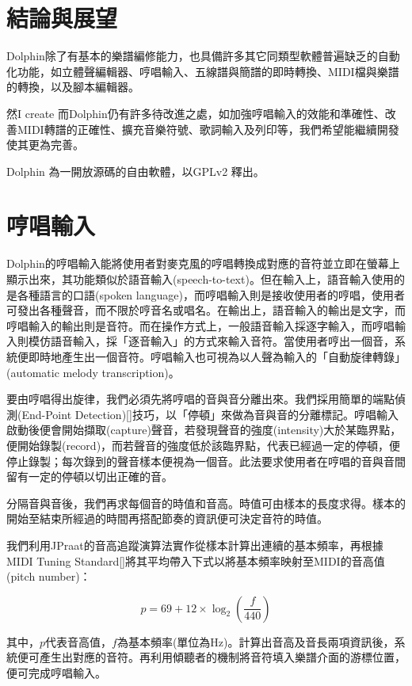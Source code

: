 \documentclass[12pt,a4paper,oneside]{report}
\begin{document}
\chapter{結論與展望}

Dolphin除了有基本的樂譜編修能力，也具備許多其它同類型軟體普遍缺乏的自動化功能，如立體聲編輯器、哼唱輸入、五線譜與簡譜的即時轉換、MIDI檔與樂譜的轉換，以及腳本編輯器。

然I create 而Dolphin仍有許多待改進之處，如加強哼唱輸入的效能和準確性、改善MIDI轉譜的正確性、擴充音樂符號、歌詞輸入及列印等，我們希望能繼續開發使其更為完善。

Dolphin 為一開放源碼的自由軟體，以GPLv2 釋出。


\appendix

\chapter{哼唱輸入}

Dolphin的哼唱輸入能將使用者對麥克風的哼唱轉換成對應的音符並立即在螢幕上顯示出來，其功能類似於語音輸入(speech-to-text)。但在輸入上，語音輸入使用的是各種語言的口語(spoken language)，而哼唱輸入則是接收使用者的哼唱，使用者可發出各種聲音，而不限於哼音名或唱名。在輸出上，語音輸入的輸出是文字，而哼唱輸入的輸出則是音符。而在操作方式上，一般語音輸入採逐字輸入，而哼唱輸入則模仿語音輸入，採「逐音輸入」的方式來輸入音符。當使用者哼出一個音，系統便即時地產生出一個音符。哼唱輸入也可視為以人聲為輸入的「自動旋律轉錄」(automatic melody transcription)。

要由哼唱得出旋律，我們必須先將哼唱的音與音分離出來。我們採用簡單的端點偵測(End-Point Detection)[]技巧，以「停頓」來做為音與音的分離標記。哼唱輸入啟動後便會開始擷取(capture)聲音，若發現聲音的強度(intensity)大於某臨界點，便開始錄製(record)，而若聲音的強度低於該臨界點，代表已經過一定的停頓，便停止錄製；每次錄到的聲音樣本便視為一個音。此法要求使用者在哼唱的音與音間留有一定的停頓以切出正確的音。

分隔音與音後，我們再求每個音的時值和音高。時值可由樣本的長度求得。樣本的開始至結束所經過的時間再搭配節奏的資訊便可決定音符的時值。

我們利用JPraat的音高追蹤演算法實作從樣本計算出連續的基本頻率，再根據MIDI Tuning Standard[]將其平均帶入下式以將基本頻率映射至MIDI的音高值(pitch number)：

\[
p=69+12\times\log_2{\left(\frac{f}{440}\right)}
\]

其中，\(p\)代表音高值，\(f\)為基本頻率(單位為Hz)。計算出音高及音長兩項資訊後，系統便可產生出對應的音符。再利用傾聽者的機制將音符填入樂譜介面的游標位置，便可完成哼唱輸入。
\end{document}
